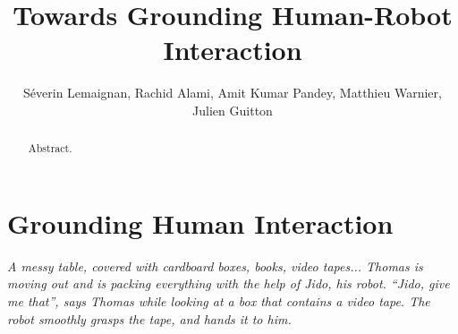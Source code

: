 \documentclass{svmult}
\begin{document}


\title*{Towards Grounding Human-Robot Interaction}

\author{
Séverin Lemaignan,
Rachid Alami,
Amit Kumar Pandey,
Matthieu Warnier,
Julien Guitton
}


\maketitle

\listoffixmes

\clearpage

\setcounter{minitocdepth}{2}
\dominitoc


\begin{abstract}
Abstract. 
\end{abstract}






\section{Grounding Human Interaction}


{\em A messy table, covered with cardboard boxes, books, video tapes... Thomas
is moving out and is packing everything with the help of Jido, his robot.
``Jido, give me that'', says Thomas while looking at a box that contains a
video tape. The robot smoothly grasps the tape, and hands it to him.}
\end{document}
